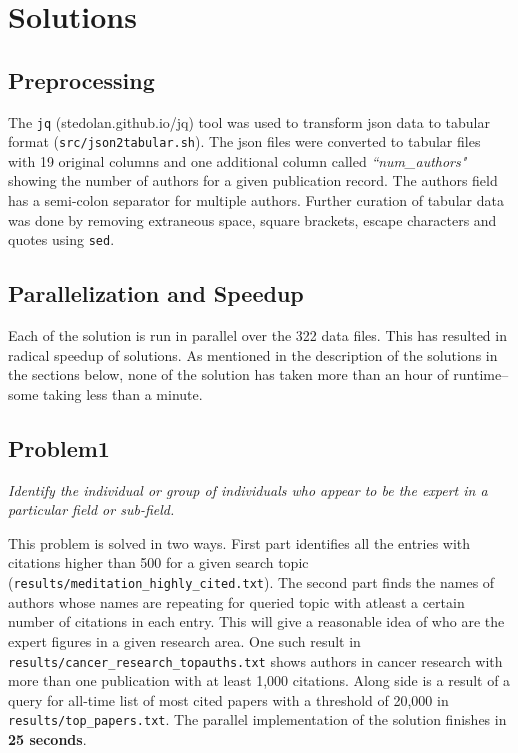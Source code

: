 \documentclass{article}
\begin{document}
\section*{Solutions}
\subsection*{Preprocessing}
The \texttt{jq} (stedolan.github.io/jq) tool was used to transform json data to
tabular format (\texttt{src/json2tabular.sh}).  The json files were converted
to tabular files with 19 original columns and one additional column called
\textit{``num\_authors"} showing the number of authors for a given publication
record. The authors field has a semi-colon separator for multiple authors.
Further curation of tabular data was done by removing extraneous space, square
brackets, escape characters and quotes using \texttt{sed}.

\subsection*{Parallelization and Speedup}
Each of the solution is run in parallel over the 322 data files. This has
resulted in radical speedup of solutions. As mentioned in the
description of the solutions in the sections below, none of the solution has
taken more than an hour of runtime--some taking less than a minute.

\subsection*{Problem1}
\textit{Identify the individual or group of individuals who appear to be the expert in a particular field or sub-field.}

This problem is solved in two ways. First part identifies all the entries with
citations higher than 500 for a given search topic
(\texttt{results/meditation\_highly\_cited.txt}). The second part finds the
names of authors whose names are repeating for queried topic with atleast a
certain number of citations in each entry. This will give a reasonable idea of
who are the expert figures in a given research area. One such result in
\texttt{results/cancer\_research\_topauths.txt} shows authors in cancer
research with more than one publication with at least 1,000 citations.  Along
side is a result of a query for all-time list of most cited papers with a
threshold of 20,000 in \texttt{results/top\_papers.txt}. The parallel
implementation of the solution finishes in \textbf{25 seconds}.
\end{document}
